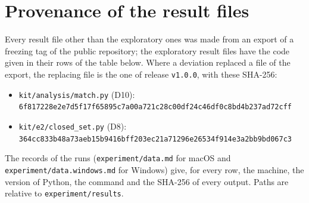 
\section*{Provenance of the result files}
\label{sec:supp-provenance}

Every result file other than the exploratory ones was made from an export of a freezing tag of the public repository;
the exploratory result files have the code given in their rows of the table below. Where a deviation replaced a file
of the export, the
replacing file is the one of release \texttt{v1.0.0}, with these SHA-256:
\begin{itemize}
\item \texttt{kit/analysis/match.py} (D10):\\
{\footnotesize\texttt{6f817228e2e7d5f17f65895c7a00a721c28c00df24c46df0c8bd4b237ad72cff}}
\item \texttt{kit/e2/closed\_set.py} (D8):\\
{\footnotesize\texttt{364cc833b48a73aeb15b9416bff203ec21a71296e26534f914e3a2bb9bd067c3}}
\end{itemize}
The records of the runs (\texttt{experiment/data.md} for macOS and \texttt{experiment/data.windows.md} for Windows)
give, for every row, the machine, the version of Python, the command and the SHA-256 of every output. Paths are
relative to \texttt{experiment/results}.

